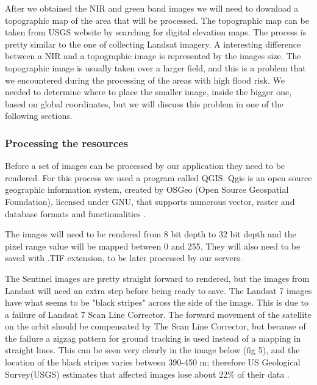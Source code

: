 \documentclass[12pt, a4paper]{report}
\begin{document}
After we obtained the NIR and green band images we will need to download a topographic map of the area that will be processed. The topographic map can be taken from USGS website by searching for digital elevation maps. The process is pretty similar to the one of collecting Landsat imagery. A interesting difference between a NIR and a topographic image is represented by the images size. The topographic image is usually taken over a larger field, and this is a problem that we encountered during the processing of the areas with high flood risk. We needed to determine where to place the smaller image, inside the bigger one, based on global coordinates, but we will discuss this problem in one of the following sections.
\par

\subsubsection{Processing the resources}

\quad
Before a set of images can be processed by our application they need to be rendered. For this process we used a program called QGIS. Qgis is an open source geographic information system, created by OSGeo (Open Source Geospatial Foundation), licensed under GNU, that supports numerous vector, raster and database formats and functionalities \cite{QGIS}.
\par 

The images will need to be rendered from 8 bit depth to 32 bit depth and the pixel range value will be mapped between 0 and 255. They will also need to be saved with .TIF extension, to be later processed by our servers.
\par 

The Sentinel images are pretty straight forward to rendered, but the images from Landsat will need an extra step before being ready to save. The Landsat 7 images have what seems to be "black stripes" across the side of the image. This is due to a failure of Landsat 7 Scan Line Corrector. The forward movement of the satellite on the orbit should be compensated by The Scan Line Corrector, but because of the failure a zigzag pattern for ground tracking is used instead of a mapping in straight lines. This can be seen very clearly in the image below (fig 5), and the location of the black stripes varies between 390-450 m; therefore US Geological Survey(USGS) estimates that affected images lose about 22\% of their data \cite{Landsat-error}.

\bigskip
\end{document}
